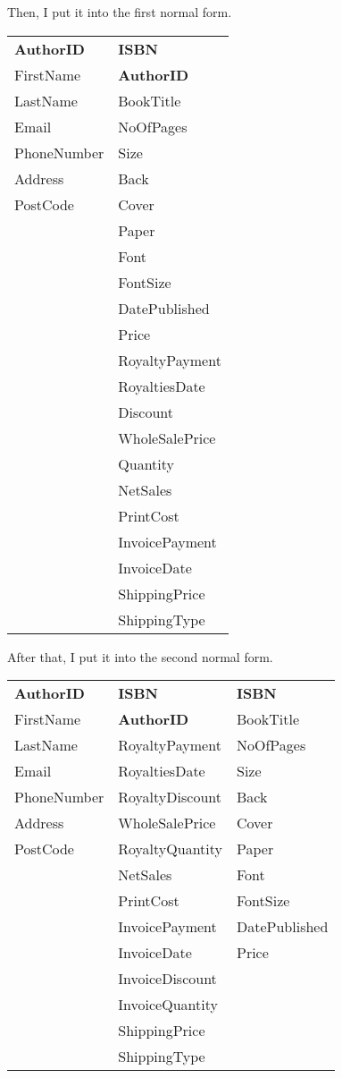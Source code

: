 Then, I put it into the first normal form.

\begin{tabular}{|p{2.5cm}|p{2.5cm}|}
    \hline
    \textbf{AuthorID} & \textbf{ISBN} \\
    FirstName & \textbf{AuthorID} \\
    LastName & BookTitle \\
    Email & NoOfPages \\
    PhoneNumber & Size \\
    Address & Back \\
    PostCode & Cover \\
    & Paper \\
    & Font \\
    & FontSize \\
    & DatePublished\\
    & Price \\
    & RoyaltyPayment \\
    & RoyaltiesDate \\
    & Discount \\
    & WholeSalePrice \\
    & Quantity \\
    & NetSales \\
    & PrintCost \\
    & InvoicePayment \\
    & InvoiceDate \\
    & ShippingPrice \\
    & ShippingType \\
    \hline
\end{tabular}

After that, I put it into the second normal form.

\begin{tabular}{|p{2.5cm}|p{2.5cm}|p{2.5cm}|}
    \hline
    \textbf{AuthorID} & \textbf{ISBN} & \textbf{ISBN} \\
    FirstName & \textbf{AuthorID} & BookTitle \\
    LastName & RoyaltyPayment & NoOfPages \\
    Email  & RoyaltiesDate & Size \\
    PhoneNumber & RoyaltyDiscount & Back \\
    Address & WholeSalePrice & Cover \\
    PostCode & RoyaltyQuantity & Paper \\
    & NetSales & Font \\
    & PrintCost & FontSize \\
    & InvoicePayment & DatePublished \\
    & InvoiceDate & Price \\
    & InvoiceDiscount & \\
    & InvoiceQuantity & \\
    & ShippingPrice & \\
    & ShippingType & \\
    \hline
\end{tabular}

